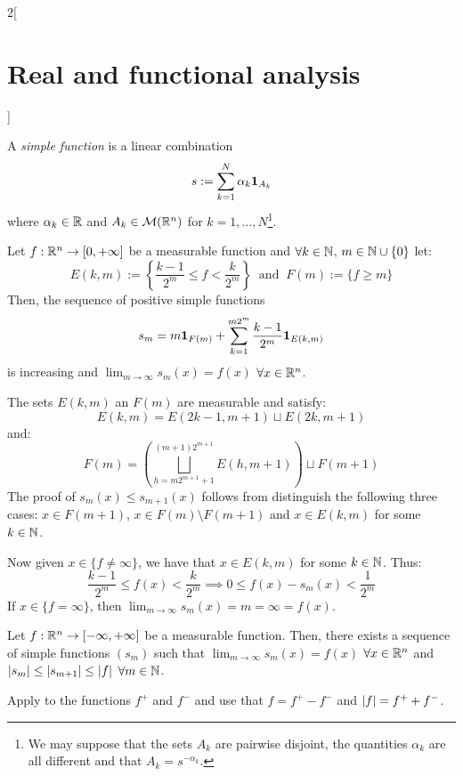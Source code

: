 \documentclass[../../../main_math.tex]{subfiles}
\begin{document}
\begin{multicols}{2}[\section{Real and functional analysis}]
\begin{definition}
    A \emph{simple function} is a linear combination $$s:=\sum_{k=1}^N\alpha_k\boldsymbol{\mathrm{1}}_{A_k}$$ where $\alpha_k\in\mathbb{R}$ and $A_k\in\mathcal{M}(\mathbb{R}^n)$ for $k=1,\ldots,N$\footnote{We may suppose that the sets $A_k$ are pairwise disjoint, the quantities $\alpha_k$ are all different and that $A_k=s^{-\alpha_k}$.}.
  \end{definition}
  \begin{theorem}\label{RFA:increasing-sm}
    Let $f:\mathbb{R}^n\rightarrow[0,+\infty]$ be a measurable function and $\forall k\in\mathbb{N}$, $m\in\mathbb{N}\cup\{0\}$ let: $$E(k,m):=\left\{\frac{k-1}{2^m}\leq f<\frac{k}{2^m}\right\}\;\;\text{and}\;\; F(m):=\{f\geq m\}$$
    Then, the sequence of positive simple functions $$s_m=m\boldsymbol{\mathrm{1}}_{F(m)}+\sum_{k=1}^{m2^m}\frac{k-1}{2^m}\boldsymbol{\mathrm{1}}_{E(k,m)}$$ is increasing and $\displaystyle\lim_{m\to\infty}s_m(x)=f(x)$ $\forall x\in\mathbb{R}^n$.
  \end{theorem}
  \begin{sproof}
    The sets $E(k,m)$ an $F(m)$ are measurable and satisfy:
    \begin{equation*}
      E(k,m)=E(2k-1,m+1)\sqcup E(2k,m+1)
    \end{equation*}
    and:
    \begin{equation*}
      F(m)=\left(\bigsqcup_{h=m2^{m+1}+1}^{(m+1)2^{m+1}}E(h,m+1)\right)\sqcup F(m+1)
    \end{equation*}
    The proof of $s_m(x)\leq s_{m+1}(x)$ follows from distinguish the following three cases: $x\in F(m+1)$, $x\in F(m)\setminus F(m+1)$ and $x\in E(k,m)$ for some $k\in\mathbb{N}$.

    Now given $x\in\{f\ne\infty\}$, we have that $x\in E(k,m)$ for some $k\in\mathbb{N}$. Thus:
    $$\frac{k-1}{2^m}\leq f(x)<\frac{k}{2^m}\implies 0\leq f(x)-s_m(x)<\frac{1}{2^m}$$
    If $x\in\{f=\infty\}$, then $\displaystyle\lim_{m\to\infty}s_m(x)=m=\infty=f(x)$.
  \end{sproof}
  \begin{theorem}
    Let $f:\mathbb{R}^n\rightarrow[-\infty,+\infty]$ be a measurable function. Then, there exists a sequence of simple functions $(s_m)$ such that $\displaystyle\lim_{m\to\infty}s_m(x)=f(x)$ $\forall x\in\mathbb{R}^n$ and $\abs{s_m}\leq\abs{s_{m+1}}\leq \abs{f}$ $\forall m\in\mathbb{N}$.
  \end{theorem}
  \begin{sproof}
    Apply  to the functions $f^+$ and $f^-$ and use that $f=f^+-f^-$ and $\abs{f}=f^++f^-$.
  \end{sproof}

\end{multicols}
\end{document}
